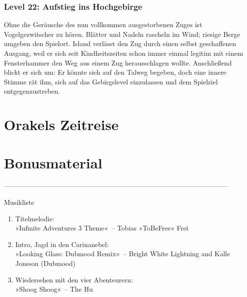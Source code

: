 \section{Level 22: Aufstieg ins Hochgebirge}

Ohne die Geräusche des nun vollkommen ausgestorbenen Zuges ist Vogelgezwitscher zu hören. Blätter und Nadeln rascheln im Wind; riesige Berge umgeben den Spielort. Island verlässt den Zug durch einen selbst geschaffenen Ausgang, weil er sich seit Kindheitszeiten schon immer einmal legitim mit einem Fensterhammer den Weg aus einem Zug herausschlagen wollte. Anschließend blickt er sich um: Er könnte sich auf den Talweg begeben, doch eine innere Stimme rät ihm, sich auf das Gebirgslevel einzulassen und dem Spielziel entgegenzustreben.





\part{Orakels Zeitreise}
























\part{Bonusmaterial}

















---------------------------------------------------------------------------------------------------

Musikliste

\begin{enumerate}
    \item Titelmelodie:\\ »Infinite Adventures 3 Theme«~– Tobias »ToBeFree« Frei
    \item Intro, Jagd in den Carinanebel:\\ »Looking Glass: Dubmood Remix«~– Bright White Lightning and Kalle Jonsson (Dubmood)
    \item Wiedersehen mit den vier Abenteurern:\\ »Shoog Shoog«~– The Hu
\end{enumerate}
